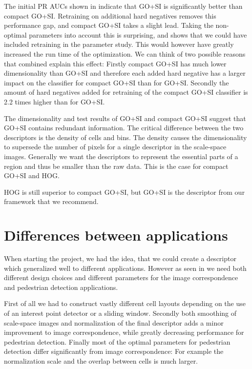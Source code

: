 \documentclass[thesis.tex]{subfiles}
\begin{document}
The initial PR AUCs shown in  indicate that GO+SI is significantly better than compact GO+SI. Retraining on additional hard negatives removes this performance gap, and compact GO+SI takes a slight lead. Taking the non-optimal parameters into account this is surprising, and shows that we could have included retraining in the parameter study. This would however have greatly increased the run time of the optimization. We can think of two possible reasons that combined explain this effect: Firstly compact GO+SI has much lower dimensionality than GO+SI and therefore each added hard negative has a larger impact on the classifier for compact GO+SI than for GO+SI. Secondly the amount of hard negatives added for retraining of the compact GO+SI classifier is 2.2 times higher than for GO+SI.

The dimensionality and test results of GO+SI and compact GO+SI suggest that GO+SI contains redundant information. The critical difference between the two descriptors is the density of cells and bins. The density causes the dimensionality to supersede the number of pixels for a single descriptor in the scale-space images. Generally we want the descriptors to represent the essential parts of a region and thus be smaller than the raw data. This is the case for compact GO+SI and HOG.

HOG is still superior to compact GO+SI, but GO+SI is the descriptor from our framework that we recommend.

\section{Differences between applications}
When starting the project, we had the idea, that we could create a descriptor which generalized well to different applications. However as seen in  we need both different design choices and different parameters for the image correspondence and pedestrian detection applications.

First of all we had to construct vastly different cell layouts depending on the use of an interest point detector or a sliding window. Secondly both smoothing of scale-space images and normalization of the final descriptor adds a minor improvement to image correspondence, while greatly decreasing performance for pedestrian detection. Finally most of the optimal parameters for pedestrian detection differ significantly from image correspondence: For example the normalization scale and the overlap between cells is much larger.
\end{document}

